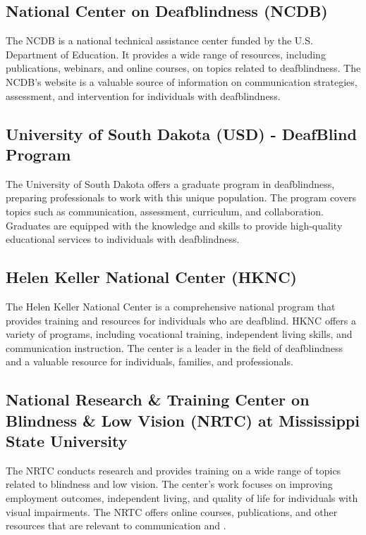 \subsection{National Center on Deafblindness (NCDB)}\label{app6:ncdb}
The NCDB is a national technical assistance center funded by the U.S. Department of Education. It provides a wide range of resources, including publications, webinars, and online courses, on topics related to deafblindness. The NCDB's website is a valuable source of information on communication strategies, assessment, and intervention for individuals with deafblindness.

\subsection{University of South Dakota (USD) - DeafBlind Program}\label{app6:usd-db}
The University of South Dakota offers a graduate program in deafblindness, preparing professionals to work with this unique population. The program covers topics such as communication, assessment, curriculum, and collaboration. Graduates are equipped with the knowledge and skills to provide high-quality educational services to individuals with deafblindness.

\subsection{Helen Keller National Center (HKNC)}\label{app6:hknc}
The Helen Keller National Center is a comprehensive national program that provides training and resources for individuals who are deafblind. HKNC offers a variety of programs, including vocational training, independent living skills, and communication instruction. The center is a leader in the field of deafblindness and a valuable resource for individuals, families, and professionals.

\subsection{National Research \& Training Center on Blindness \& Low Vision (NRTC) at Mississippi State University}\label{app6:nrtc}
The NRTC conducts research and provides training on a wide range of topics related to blindness and low vision. The center's work focuses on improving employment outcomes, independent living, and quality of life for individuals with visual impairments. The NRTC offers online courses, publications, and other resources that are relevant to communication and .

